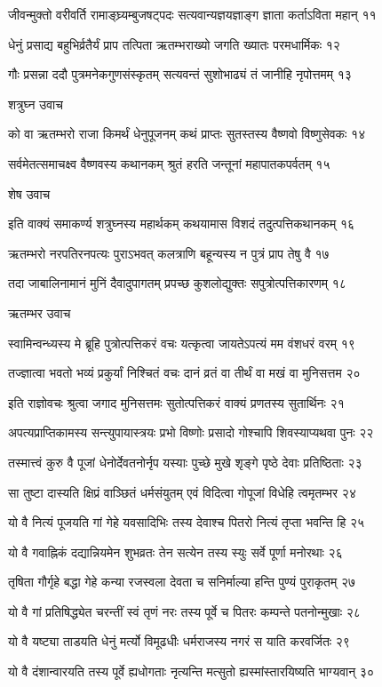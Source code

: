 जीवन्मुक्तो वरीवर्ति रामाङ्घ्र्यम्बुजषट्पदः
सत्यवान्यज्ञयज्ञाङ्ग ज्ञाता कर्ताऽविता महान् ११

धेनुं प्रसाद्य बहुभिर्व्रतैर्यं प्राप तत्पिता
ऋतम्भराख्यो जगति ख्यातः परमधार्मिकः १२

गौः प्रसन्ना ददौ पुत्रमनेकगुणसंस्कृतम्
सत्यवन्तं सुशोभाढ्यं तं जानीहि नृपोत्तमम् १३

शत्रुघ्न उवाच

को वा ऋतम्भरो राजा किमर्थं धेनुपूजनम्
कथं प्राप्तः सुतस्तस्य वैष्णवो विष्णुसेवकः १४

सर्वमेतत्समाचक्ष्व वैष्णवस्य कथानकम्
श्रुतं हरति जन्तूनां महापातकपर्वतम् १५

शेष उवाच

इति वाक्यं समाकर्ण्य शत्रुघ्नस्य महार्थकम्
कथयामास विशदं तदुत्पत्तिकथानकम् १६

ऋतम्भरो नरपतिरनपत्यः पुराऽभवत्
कलत्राणि बहून्यस्य न पुत्रं प्राप तेषु वै १७

तदा जाबालिनामानं मुनिं दैवादुपागतम्
प्रपच्छ कुशलोद्युक्तः सपुत्रोत्पत्तिकारणम् १८

ऋतम्भर उवाच

स्वामिन्वन्ध्यस्य मे ब्रूहि पुत्रोत्पत्तिकरं वचः
यत्कृत्वा जायतेऽपत्यं मम वंशधरं वरम् १९

तज्ज्ञात्वा भवतो भव्यं प्रकुर्यां निश्चितं वचः
दानं व्रतं वा तीर्थं वा मखं वा मुनिसत्तम २०

इति राज्ञोवचः श्रुत्वा जगाद मुनिसत्तमः
सुतोत्पत्तिकरं वाक्यं प्रणतस्य सुतार्थिनः २१

अपत्यप्राप्तिकामस्य सन्त्युपायास्त्रयः प्रभो
विष्णोः प्रसादो गोश्चापि शिवस्याप्यथवा पुनः २२

तस्मात्त्वं कुरु वै पूजां धेनोर्देवतनोर्नृप
यस्याः पुच्छे मुखे शृङ्गे पृष्ठे देवाः प्रतिष्ठिताः २३

सा तुष्टा दास्यति क्षिप्रं वाञ्छितं धर्मसंयुतम्
एवं विदित्वा गोपूजां विधेहि त्वमृतम्भर २४

यो वै नित्यं पूजयति गां गेहे यवसादिभिः
तस्य देवाश्च पितरो नित्यं तृप्ता भवन्ति हि २५

यो वै गवाह्निकं दद्यान्नियमेन शुभव्रतः
तेन सत्येन तस्य स्युः सर्वे पूर्णा मनोरथाः २६

तृषिता गौर्गृहे बद्धा गेहे कन्या रजस्वला
देवता च सनिर्माल्या हन्ति पुण्यं पुराकृतम् २७

यो वै गां प्रतिषिद्ध्येत चरन्तीं स्वं तृणं नरः
तस्य पूर्वे च पितरः कम्पन्ते पतनोन्मुखाः २८

यो वै यष्ट्या ताडयति धेनुं मर्त्यो विमूढधीः
धर्मराजस्य नगरं स याति करवर्जितः २९

यो वै दंशान्वारयति तस्य पूर्वे ह्यधोगताः
नृत्यन्ति मत्सुतो ह्यस्मांस्तारयिष्यति भाग्यवान् ३०

